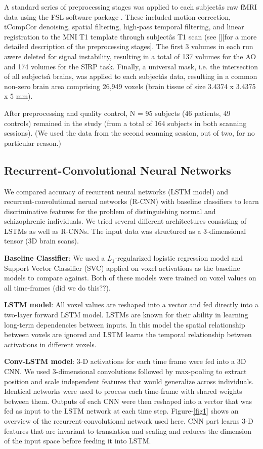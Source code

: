 \documentclass{article}
\begin{document}
A standard series of preprocessing stages was applied to each subjectâs raw fMRI data using the FSL software package \citep{Jenkinson2012}. These included motion correction, tCompCor denoising, spatial filtering, high-pass temporal filtering, and linear registration to the MNI T1 template through subjectâs T1 scan (see \citep[see]{Gheiratmand2017}[][for a more detailed description of the preprocessing stages]. The first 3 volumes in each run awere deleted for signal instability, resulting in a total of 137 volumes for the AO and 174 volumes for the SIRP task. Finally, a universal mask, i.e. the intersection of all subjectsâ brains, was applied to each subjectâs data, resulting in a common non-zero brain area comprising 26,949 voxels (brain tissue of size 3.4374 x 3.4375 x 5 mm).

After preprocessing and quality control, N = 95 subjects (46 patients, 49 controls) remained in the study (from a total of 164 subjects in both scanning sessions). (We used the data from the second scanning session, out of two, for no particular reason.)

\subsection{Recurrent-Convolutional Neural Networks}
We compared accuracy of recurrent neural networks (LSTM model) and recurrent-convolutional nerual networks (R-CNN) with baseline classifiers to learn discriminative features for the problem of distinguishing normal and schizophrenic individuals. We tried several different architectures consisting of LSTMs as well as R-CNNs. The input data was structured as a 3-dimensional tensor (3D brain scans). 

\textbf{Baseline Classifier}: We used a $L_1$-regularized logistic regression model and Support Vector Classifier (SVC) applied on voxel activations as the baseline models to compare against. Both of these models were trained on voxel values on all time-frames (did we do this??). 

\textbf{LSTM model}: All voxel values are reshaped into a vector and fed directly into a two-layer forward LSTM model. LSTMs are known for their ability in learning long-term dependencies between inputs. In this model the spatial relationship between voxels are ignored and LSTM learns the temporal relationship between activations in different voxels. 

\textbf{Conv-LSTM model}: 3-D activations for each time frame were fed into a 3D CNN. We used 3-dimensional convolutions followed by max-pooling to extract position and scale independent features that would generalize across individuals. Identical networks were used to process each time-frame with shared weights between them. Outputs of each CNN were then reshaped into a vector that was fed as input to the LSTM network at each time step. Figure-\ref{fig1} shows an overview of the recurrent-convolutional network used here. CNN part learns 3-D features that are invariant to translation and scaling and reduces the dimension of the input space before feeding it into LSTM. 
\end{document}
